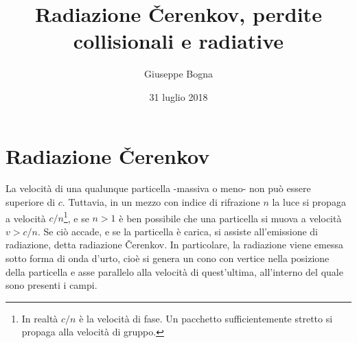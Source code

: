 \documentclass{article}
\title{Radiazione Čerenkov, perdite collisionali e radiative}
\author{Giuseppe Bogna}
\date{31 luglio 2018}
\begin{document}
	\maketitle
	\section{Radiazione Čerenkov}
	La velocità di una qualunque particella -massiva o meno- non può essere superiore di $c$. Tuttavia, in un mezzo con indice di rifrazione $n$ la luce si propaga a velocità $c/n$\footnote{In realtà $c/n$ è la velocità di fase. Un pacchetto sufficientemente stretto si propaga alla velocità di gruppo.}, e se $n>1$ è ben possibile che una particella si muova a velocità $v>c/n$. Se ciò accade, e se la particella è carica, si assiste all'emissione di radiazione, detta radiazione Čerenkov. In particolare, la radiazione viene emessa sotto forma di onda d'urto, cioè si genera un cono con vertice nella posizione della particella e asse parallelo alla velocità di quest'ultima, all'interno del quale sono presenti i campi.
\end{document}
